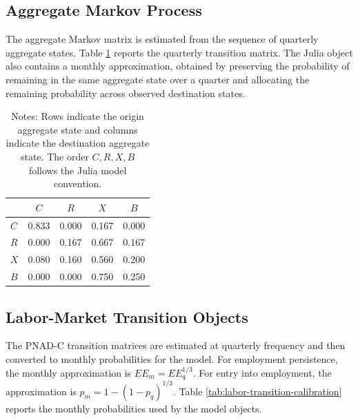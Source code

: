 \documentclass[12pt]{article}
\begin{document}
	\subsection{Aggregate Markov Process}
	
	The aggregate Markov matrix is estimated from the sequence of quarterly aggregate states. Table \ref{tab:z-transition} reports the quarterly transition matrix. The Julia object also contains a monthly approximation, obtained by preserving the probability of remaining in the same aggregate state over a quarter and allocating the remaining probability across observed destination states.
	
	\begin{table}[H]
		\centering
		\caption{Quarterly Transition Matrix for Aggregate States}
		\label{tab:z-transition}
		\small
		\begin{tabular}{lcccc}
			\toprule
			 & $C$ & $R$ & $X$ & $B$ \\
			\midrule
			$C$ & 0.833 & 0.000 & 0.167 & 0.000 \\
			$R$ & 0.000 & 0.167 & 0.667 & 0.167 \\
			$X$ & 0.080 & 0.160 & 0.560 & 0.200 \\
			$B$ & 0.000 & 0.000 & 0.750 & 0.250 \\
			\bottomrule
		\end{tabular}
		\caption*{Notes: Rows indicate the origin aggregate state and columns indicate the destination aggregate state. The order $C,R,X,B$ follows the Julia model convention.}
	\end{table}
	
	\subsection{Labor-Market Transition Objects}
	
	The PNAD-C transition matrices are estimated at quarterly frequency and then converted to monthly probabilities for the model. For employment persistence, the monthly approximation is $EE_m=EE_q^{1/3}$. For entry into employment, the approximation is $p_m=1-(1-p_q)^{1/3}$. Table \ref{tab:labor-transition-calibration} reports the monthly probabilities used by the model objects.
	
\end{document}
